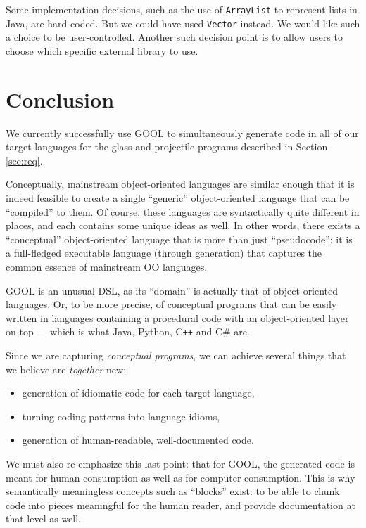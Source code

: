 \documentclass[sigplan,review,prologue,dvipsnames]{acmart}
\newcommand{\Csharp}{C\#}
\newcommand{\Cplusplus}{C\texttt{++}}
\begin{document}
Some implementation decisions, such as the use of \verb|ArrayList| to represent
lists in Java, are hard-coded. But we could have used \verb|Vector| instead.
We would like such a choice to be user-controlled. Another such decision
point is to allow users to choose which specific external library to use.

\section{Conclusion} \label{sec:conclusions}

We currently successfully use GOOL to simultaneously generate code in all of 
our target languages for the glass and projectile programs described in Section 
\ref{sec:req}. 

Conceptually, mainstream object-oriented languages are similar enough that it
is indeed feasible to create a single ``generic'' object-oriented language that
can be ``compiled'' to them.  Of course, these languages are syntactically
quite different in places, and each contains some unique ideas as well.
In other words, there exists a ``conceptual'' object-oriented language that
is more than just ``pseudocode'': it is a full-fledged executable language
(through generation) that captures the common essence of mainstream OO
languages.

GOOL is an unusual DSL, as its ``domain'' is actually that of object-oriented
languages. Or, to be more precise, of conceptual programs that can be
easily written in languages containing a procedural code with an
object-oriented layer on top --- which is what Java, Python, \Cplusplus{} and
\Csharp{} are.

Since we are capturing \emph{conceptual programs}, we can achieve
several things that we believe are \emph{together} new:
\begin{itemize}
\item generation of idiomatic code for each target language,
\item turning coding patterns into language idioms,
\item generation of human-readable, well-documented code.
\end{itemize}

We must also re-emphasize this last point: that for GOOL, the generated code
is meant for human consumption as well as for computer consumption. This is
why semantically meaningless concepts such as ``blocks'' exist: to be able
to chunk code into pieces meaningful for the human reader, and provide
documentation at that level as well.
\end{document}
